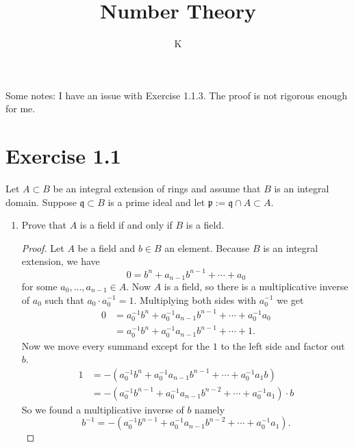 \documentclass[a4paper]{article}
\title{Number Theory}
\author{K}
\begin{document}
Some notes: I have an issue with Exercise 1.1.3. The proof is not rigorous enough for me.
\section*{Exercise 1.1}
Let \(A \subset B\) be an integral extension of rings and assume that \(B\) is an integral domain. Suppose \(\mathfrak{q} \subset B\) is a prime ideal and let \(\mathfrak{p} := 
\mathfrak{q} \cap A \subset A\).
\begin{enumerate}
  \item Prove that \(A\) is a field if and only if \(B\) is a field.
  \begin{proof}
    Let \(A\) be a field and \(b \in B\) an element. Because \(B\) is an integral extension, we have
    \begin{equation*}
      0 = b^n + a_{n-1} b^{n-1} + \cdots + a_0
    \end{equation*}
    for some \(a_0, \ldots, a_{n-1} \in A\). Now \(A\) is a field, so there is a multiplicative inverse of \(a_0\) such that \(a_0 \cdot a_0^{-1} = 1\). Multiplying both sides with \(a_0^{-1}\) we get
    \begin{align*}
      0 &= a_0^{-1} b^n + a_0^{-1} a_{n-1} b^{n-1} + \cdots + a_0^{-1}a_0 \\
      &= a_0^{-1} b^n + a_0^{-1} a_{n-1} b^{n-1} + \cdots + 1 \text{.}
    \end{align*}
    Now we move every summand except for the \(1\) to the left side and factor out \(b\).
    \begin{align*}
      1 &= -(a_0^{-1} b^n + a_0^{-1} a_{n-1} b^{n-1} + \cdots + a_0^{-1} a_1 b) \\
      &= -(a_0^{-1} b^{n-1} + a_0^{-1} a_{n-1} b^{n-2} + \cdots + a_0^{-1} a_1) \cdot b
    \end{align*}
    So we found a multiplicative inverse of \(b\) namely
    \begin{equation*}
      b^{-1} = -(a_0^{-1} b^{n-1} + a_0^{-1} a_{n-1} b^{n-2} + \cdots + a_0^{-1} a_1)\text{.}
    \end{equation*}


\end{proof}
\end{enumerate}
\end{document}
